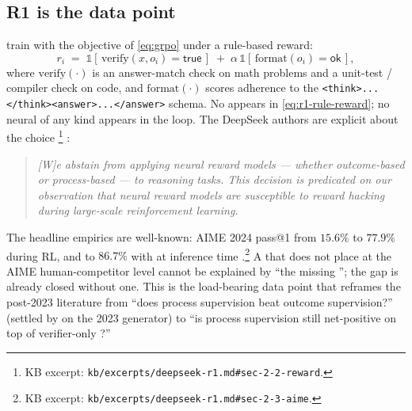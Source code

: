 \subsection{R1 is the data point}
\label{sec:prm-survival-r1}

 train  with the 
objective of \cref{eq:grpo} under a rule-based reward:
\begin{equation}
  r_i \;=\; \mathbb{1}\!\left[\, \mathrm{verify}(x, o_i) = \mathsf{true}\,\right]
  \;+\; \alpha\,\mathbb{1}\!\left[\, \mathrm{format}(o_i) = \mathsf{ok}\,\right],
  \label{eq:r1-rule-reward}
\end{equation}
where $\mathrm{verify}(\cdot)$ is an answer-match check on math
problems and a unit-test / compiler check on code, and
$\mathrm{format}(\cdot)$ scores adherence to the
\verb|<think>...</think><answer>...</answer>| schema. No  appears
in \cref{eq:r1-rule-reward}; no neural  of any kind appears
in the loop. The DeepSeek authors are explicit about the choice%
\footnote{KB excerpt: \texttt{kb/excerpts/deepseek-r1.md\#sec-2-2-reward}.}
\citep[\S 2.2]{deepseek-r1}:
\begin{quote}
\itshape
[W]e abstain from applying neural reward models — whether outcome-based
or process-based — to reasoning tasks. This decision is predicated on
our observation that neural reward models are susceptible to reward
hacking during large-scale reinforcement learning.
\end{quote}
The headline empirics are well-known: AIME 2024 pass@1 from
$15.6\%$ to $77.9\%$ during RL, and to $86.7\%$ with 
at inference time \citep[\S 2.3]{deepseek-r1}.\footnote{KB excerpt:
\texttt{kb/excerpts/deepseek-r1.md\#sec-2-3-aime}.} A 
that does not place at the AIME human-competitor level cannot be
explained by ``the missing ''; the gap is
already closed without one. This is the load-bearing data point that
reframes the post-2023  literature from ``does process supervision
beat outcome supervision?'' (settled by \citet{lightman2023-prm800k} on
the 2023 generator) to ``is process supervision still net-positive on
top of verifier-only ?''

